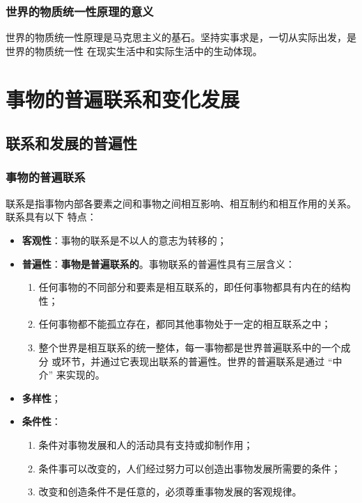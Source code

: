 \documentclass[10pt, UTF8]{book} %
\begin{document}
\subsubsection{世界的物质统一性原理的意义}

世界的物质统一性原理是马克思主义的基石。坚持实事求是，一切从实际出发，是世界的物质统一性
在现实生活中和实际生活中的生动体现。

\section{事物的普遍联系和变化发展}

\subsection{联系和发展的普遍性}

\subsubsection{事物的普遍联系}

联系是指事物内部各要素之间和事物之间相互影响、相互制约和相互作用的关系。联系具有以下
特点：
\begin{itemize}[itemsep=0pt]
    \item \textbf{客观性}：事物的联系是不以人的意志为转移的；
    \item \textbf{普遍性}：\textbf{事物是普遍联系的}。事物联系的普遍性具有三层含义：
    \begin{enumerate}[label={${\arabic*}^\circ$}, itemsep=0pt]
        \item 任何事物的不同部分和要素是相互联系的，即任何事物都具有内在的结构性；
        \item 任何事物都不能孤立存在，都同其他事物处于一定的相互联系之中；
        \item 整个世界是相互联系的统一整体，每一事物都是世界普遍联系中的一个成分
        或环节，并通过它表现出联系的普遍性。世界的普遍联系是通过 “中介” 来实现的。
    \end{enumerate}
    \item \textbf{多样性}；
    \item \textbf{条件性}：
    \begin{enumerate}[label={${\arabic*}^\circ$}, itemsep=0pt]
        \item 条件对事物发展和人的活动具有支持或抑制作用；
        \item 条件事可以改变的，人们经过努力可以创造出事物发展所需要的条件；
        \item 改变和创造条件不是任意的，必须尊重事物发展的客观规律。
    \end{enumerate}
\end{itemize}
\end{document}
